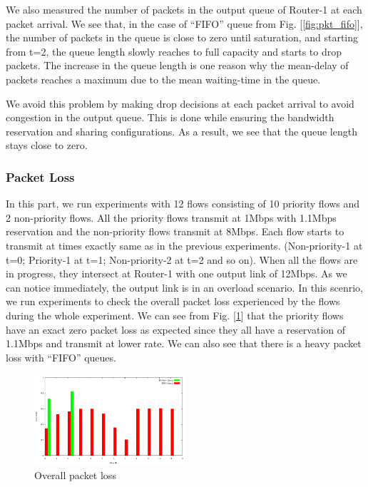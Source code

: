\documentclass[10pt,sigconf,letterpaper,anonymous]{acmart}
\begin{document}
We also measured the number of packets in the output queue of Router-1 at each packet arrival. We see that, in the case of ``FIFO'' queue from Fig. [\ref{fig:pkt_fifo}], the number of packets in the queue is close to zero until saturation, and starting from t=2, the queue length slowly reaches to full capacity and starts to drop packets. The increase in the queue length is one reason why the mean-delay of packets reaches a maximum due to the mean waiting-time in the queue.

We avoid this problem by making drop decisions at each packet arrival to avoid congestion in the output queue. This is done while ensuring the bandwidth reservation and sharing configurations. As a result, we see that the queue length stays close to zero.

\subsubsection{Packet Loss}
In this part, we run experiments with 12 flows consisting of 10 priority flows and 2 non-priority flows. All the priority flows transmit at 1Mbps with 1.1Mbps reservation and the non-priority flows transmit at 8Mbps. Each flow starts to transmit at times exactly same as in the previous experiments. (Non-priority-1 at t=0; Priority-1 at t=1; Non-priority-2 at t=2 and so on). When all the flows are in progress, they intersect at Router-1 with one output link of 12Mbps. As we can notice immediately, the output link is in an overload scenario. In this scenrio, we run experiments to check the overall packet loss experienced by the flows during the whole experiment. We can see from Fig. [\ref{fig:loss}] that the priority flows have an exact zero packet loss as expected since they all have a reservation of 1.1Mbps and transmit at lower rate. We can also see that there is a heavy packet loss with ``FIFO'' queues. 

\begin{figure}[ht]
	\begin{center}
		\includegraphics[width=0.50\textwidth]{plots/loss.pdf}
		\caption{Overall packet loss}\label{fig:loss}
	\end{center}
\end{figure}
\end{document}
